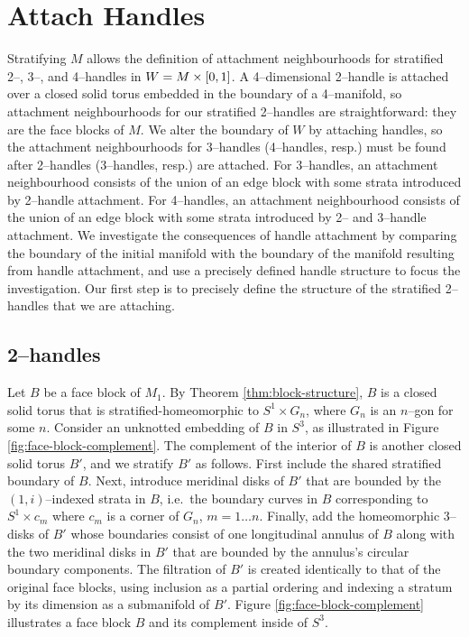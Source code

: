 \section{Attach Handles}

Stratifying $M$ allows the definition of attachment neighbourhoods for stratified 2--, 3--, and 4--handles in $W=M\times[0,1]$.
A 4--dimensional 2--handle is attached over a closed solid torus embedded in the boundary of a 4--manifold, so attachment neighbourhoods for our stratified 2--handles are straightforward: they are the face blocks of $M$.
We alter the boundary of $W$ by attaching handles, so the attachment neighbourhoods for 3--handles (4--handles, resp.) must be found after 2--handles (3--handles, resp.) are attached.
For 3--handles, an attachment neighbourhood consists of the union of an edge block with some strata introduced by 2--handle attachment.
For 4--handles, an attachment neighbourhood consists of the union of an edge block with some strata introduced by 2-- and 3--handle attachment.
We investigate the consequences of handle attachment by comparing the boundary of the initial manifold with the boundary of the manifold resulting from handle attachment, and use a precisely defined handle structure to focus the investigation.
Our first step is to precisely define the structure of the stratified 2--handles that we are attaching.

\subsection{2--handles}

Let $B$ be a face block of $M_1$.
By Theorem \ref{thm:block-structure}, $B$ is a closed solid torus that is stratified-homeomorphic to $S^1\times G_n$, where $G_n$ is an $n$--gon for some $n$.
Consider an unknotted embedding of $B$ in $S^3$, as illustrated in Figure \ref{fig:face-block-complement}.
The complement of the interior of $B$ is another closed solid torus $B'$, and we stratify $B'$ as follows.
First include the shared stratified boundary of $B$.
Next, introduce meridinal disks of $B'$ that are bounded by the $(1,i)$--indexed strata in $B$, i.e.\ the boundary curves in $B$ corresponding to $S^1\times c_m$ where $c_m$ is a corner of $G_n$, $m=1\dots n$.
Finally, add the homeomorphic 3--disks of $B'$ whose boundaries consist of one longitudinal annulus of $B$ along with the two meridinal disks in $B'$ that are bounded by the annulus's circular boundary components.
The filtration of $B'$ is created identically to that of the original face blocks, using inclusion as a partial ordering and indexing a stratum by its dimension as a submanifold of $B'$.
Figure \ref{fig:face-block-complement} illustrates a face block $B$ and its complement inside of $S^3$.

